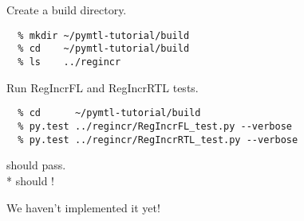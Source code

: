 
\section[{\it Hands-On} RegIncr]{}

\begin{task}\begin{frame}[fragile]{Create a build directory.}

\begin{verbatim}
  % mkdir ~/pymtl-tutorial/build
  % cd    ~/pymtl-tutorial/build
  % ls    ../regincr
\end{verbatim}

\end{frame}
\end{task}

\begin{task}\begin{frame}[fragile]{Run RegIncrFL and RegIncrRTL tests.}

\begin{verbatim}
  % cd      ~/pymtl-tutorial/build
  % py.test ../regincr/RegIncrFL_test.py --verbose
  % py.test ../regincr/RegIncrRTL_test.py --verbose
\end{verbatim}

\begin{centering}
 should pass. \\*
 should !

\vspace{0.4in}
We haven't implemented it yet!

\end{centering}

\end{frame}
\end{task}

